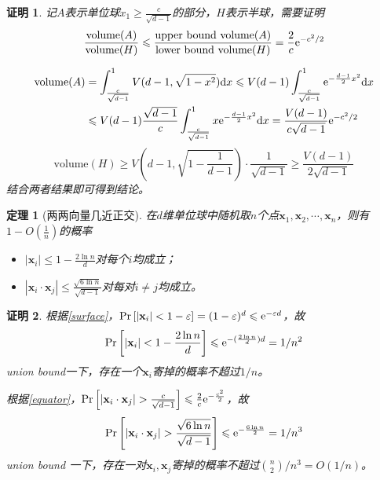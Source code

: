 \documentclass[8pt]{article}
\theoremstyle{compact}
\newtheorem{theorem}{定理}
\newtheorem{Proof}{证明}
\def\le{\leqslant}
\def\ge{\geqslant}
\def\Pr#1{\text{Pr}\left[{#1}\right]}
\begin{document}
\begin{Proof}
	记$A$表示单位球$x_1 \ge \frac{c}{\sqrt{d-1}}$的部分，$H$表示半球，需要证明\begin{equation}
	\frac{\text{volume}(A)}{\text{volume}(H)} \le \frac{\text{upper bound volume}(A)}{\text{lower bound volume}(H)} = \frac{2}{c}\text e^{-c^2/2}
	\end{equation}
	
	\begin{equation}
	\begin{split}
	\text{volume}(A) &= \int_{\frac{c}{\sqrt{d-1}}}^{1}V(d-1, \sqrt{1 - x^2})\text dx \le V(d-1)\int_{\frac{c}{\sqrt{d-1}}}^{1}\text e^{-\frac{d-1}{2}x^2}\text dx\\
	&\le V(d-1)\frac{\sqrt{d-1}}{c}\int_{\frac{c}{\sqrt{d-1}}}^{1}x\text e^{-\frac{d-1}{2}x^2}\text dx
	= \frac{V(d-1)}{c\sqrt{d-1}}\text e^{-c^2/2}
	\end{split}
	\end{equation}
	\begin{equation}
	\text{volume}(H) \ge V\left(d-1, \sqrt{1 - \frac{1}{d-1}}\right) \cdot \frac{1}{\sqrt{d-1}} \ge \frac{V(d-1)}{2\sqrt{d-1}}
	\end{equation}
	结合两者结果即可得到结论。
\end{Proof}
\begin{theorem}[两两向量几近正交]
	在$d$维单位球中随机取$n$个点$\mathbf x_1, \mathbf x_2, \cdots, \mathbf x_n$，则有$1 - O(\frac 1n)$的概率
	\begin{itemize}
		\item $|\mathbf x_i| \le 1 - \frac{2\ln n}{d}$对每个$i$均成立；
		\item $|\mathbf x_i \cdot \mathbf x_j| \le \frac{\sqrt{6 \ln n}}{\sqrt{d-1}}$对每对$i \neq j$均成立。
	\end{itemize}
\end{theorem}
\begin{Proof}
	根据\cref{surface}，$\Pr{|\mathbf x_i| < 1 - \varepsilon} = (1 - \varepsilon)^d \le \text e^{-\varepsilon d}$，故
	\begin{equation}
	\Pr{|\mathbf x_i| < 1 - \frac{2\ln n}{d}} \le \text e^{-(\frac{2\ln n}{d})d} = 1 / n^2
	\end{equation}
	union bound一下，存在一个$\mathbf x_i$寄掉的概率不超过$1/n$。
	
	根据\cref{equator}，$\Pr{|\mathbf x_i \cdot \mathbf x_j| > \frac{c}{\sqrt{d-1}}} \le \frac{2}{c}\text e^{-\frac{c^2}{2}}$，故
	\begin{equation}
	\Pr{|\mathbf x_i \cdot \mathbf x_j| > \frac{\sqrt{6\ln n}}{\sqrt{d-1}}} \le \text e^{-\frac{6\ln n}{2}} = 1 / n^3
	\end{equation}
	union bound 一下，存在一对$\mathbf x_i, \mathbf x_j$寄掉的概率不超过$\binom{n}{2} / n^3 = O(1/n)$。
\end{Proof}
\end{document}
